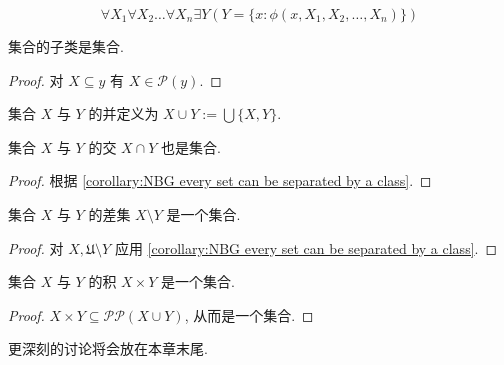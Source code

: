 \begin{axiom}
    \label {axiom:BG Axiom of Comprehension}
    \[
        \forall X_1 \forall X_2 \dots \forall X_n \exists Y (Y = \{x : \phi (x,X_1,X_2, \dots,X_n)\})
    \]
\end{axiom}

\begin{corollary}
    集合的子类是集合.

    \begin{proof}
        对 \(X \subseteq y\) 有 \(X \in \mathcal{P} (y)\).
    \end{proof}
\end{corollary}

\begin{definition}
    \label {definition:union of two sets}
    集合 \(X\) 与 \(Y\) 的并定义为 \(X \cup Y := \bigcup \{X,Y\}\).
\end{definition}

\begin{definition}
    \label {definition:intersection of two sets}
    集合 \(X\) 与 \(Y\) 的交 \(X \cap Y\) 也是集合.

    \begin{proof}
        根据 \ref{corollary:NBG every set can be separated by a class}.
    \end{proof}
\end{definition}

\begin{definition}
    \label {definition:difference of two sets}
    集合 \(X\) 与 \(Y\) 的差集 \(X \setminus Y\) 是一个集合.

    \begin{proof}
        对 \(X, \mathfrak{U} \setminus Y\) 应用 \ref{corollary:NBG every set can be separated by a class}.
    \end{proof}
\end{definition}

\begin{definition}
    \label {definition:product of two sets}
    集合 \(X\) 与 \(Y\) 的积 \(X \times Y\) 是一个集合.

    \begin{proof}
        \(X \times Y \subseteq \mathcal{P} \mathcal{P} (X \cup Y)\), 从而是一个集合.
    \end{proof}
\end{definition}

更深刻的讨论将会放在本章末尾.

